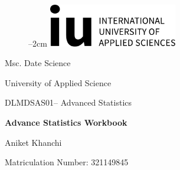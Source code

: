 \label{titlePage}
\begin{figure}[h]
\centering
\advance\leftskip--2cm
\includegraphics[width=0.50\textwidth]{logo.pdf}
\end{figure}


\begin{Large} 
\begin{center}
    Msc. Date Science
\end{center}
\end{Large} 

\vspace*{5mm}

\begin{large} 
\begin{center}
University of Applied Science 
\end{center}
\end{large} 

\begin{large} 
\begin{center}
    DLMDSAS01– Advanced Statistics
\end{center}
\end{large}

\vspace*{15mm}

\begin{Large} 
\begin{center}
\textbf{Advance Statistics Workbook}
\end{center}
\end{Large}

\vspace*{15mm}

\begin{large} 
\begin{center}
Aniket Khanchi
\end{center}
\end{large} 

\vspace*{-6mm}

\begin{large} 
\begin{center}
    Matriculation Number: 321149845
\end{center}
\end{large} 



